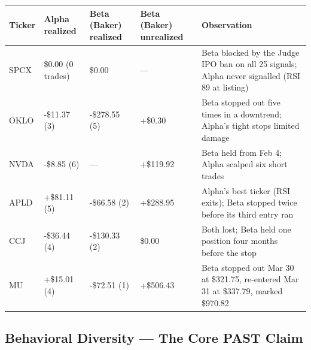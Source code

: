 \documentclass[11pt]{article}
\begin{document}
{\def\LTcaptype{none} %
{\small
\begin{longtable}{@{}
  >{\raggedright\arraybackslash}p{}
  >{\raggedright\arraybackslash}p{}
  >{\raggedright\arraybackslash}p{}
  >{\raggedright\arraybackslash}p{}
  >{\raggedright\arraybackslash}p{}@{}}
\toprule\noalign{}
\begin{minipage}[b]{\linewidth}\raggedright
Ticker
\end{minipage} & \begin{minipage}[b]{\linewidth}\raggedright
Alpha realized
\end{minipage} & \begin{minipage}[b]{\linewidth}\raggedright
Beta (Baker) realized
\end{minipage} & \begin{minipage}[b]{\linewidth}\raggedright
Beta (Baker) unrealized
\end{minipage} & \begin{minipage}[b]{\linewidth}\raggedright
Observation
\end{minipage} \\
\midrule\noalign{}
\endhead
\bottomrule\noalign{}
\endlastfoot
\renewcommand{\arraystretch}{1.15}
SPCX & \$0.00 (0 trades) & \$0.00 & --- & Beta blocked by the Judge IPO ban on all 25 signals; Alpha never signalled (RSI 89 at listing) \\
OKLO & -\$11.37 (3) & -\$278.55 (5) & +\$0.30 & Beta stopped out five times in a downtrend; Alpha's tight stops limited damage \\
NVDA & -\$8.85 (6) & --- & +\$119.92 & Beta held from Feb 4; Alpha scalped six short trades \\
APLD & +\$81.11 (5) & -\$66.58 (2) & +\$288.95 & Alpha's best ticker (RSI exits); Beta stopped twice before its third entry ran \\
CCJ & -\$36.44 (4) & -\$130.33 (2) & \$0.00 & Both lost; Beta held one position four months before the stop \\
MU & +\$15.01 (4) & -\$72.51 (1) & +\$506.43 & Beta stopped out Mar 30 at \$321.75, re-entered Mar 31 at \$337.79, marked \$970.82 \\
\end{longtable}}
}

\subsection{Behavioral Diversity --- The Core PAST Claim}\label{behavioral-diversity-the-core-past-claim}
\end{document}
